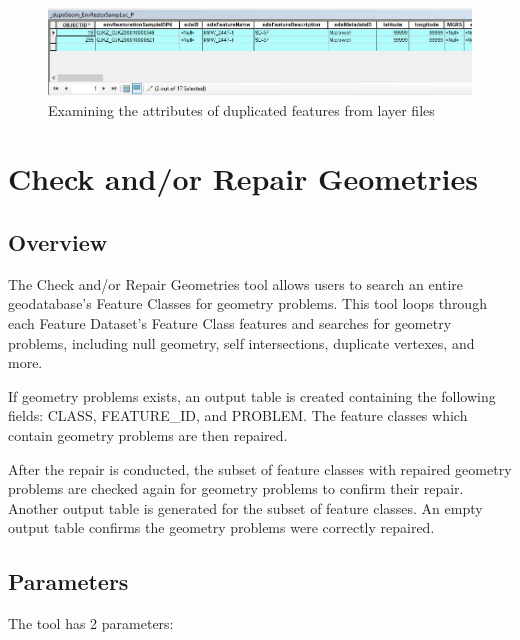 \documentclass[openany]{book}
\theoremstyle{definition}
\theoremstyle{definition}
\theoremstyle{definition}
\theoremstyle{remark}
\begin{document}
\begin{figure}[H]

{\centering \includegraphics[width=4.79in,]{figures/dupG-layAtts} 

}

\caption{Examining the attributes of duplicated features from layer files}\label{fig:layAtts}
\end{figure}

\hypertarget{chkGeom}{\chapter{Check and/or Repair
Geometries}\label{chkGeom}}

\section{Overview}\label{overview-5}

The Check and/or Repair Geometries tool allows users to search an entire
geodatabase's Feature Classes for geometry problems. This tool loops
through each Feature Dataset's Feature Class features and searches for
geometry problems, including null geometry, self intersections,
duplicate vertexes, and more.

If geometry problems exists, an output table is created containing the
following fields: CLASS, FEATURE\_ID, and PROBLEM. The feature classes
which contain geometry problems are then repaired.

After the repair is conducted, the subset of feature classes with
repaired geometry problems are checked again for geometry problems to
confirm their repair. Another output table is generated for the subset
of feature classes. An empty output table confirms the geometry problems
were correctly repaired.

\section{Parameters}\label{parameters-5}

The tool has 2 parameters:
\end{document}
